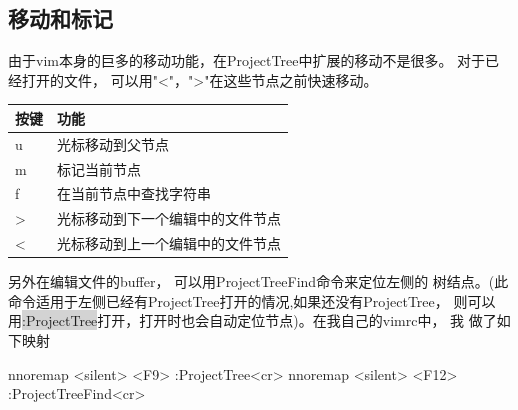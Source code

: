 \documentclass[oneside,openany]{book}
\begin{document}
  \subsection{移动和标记}
  由于vim本身的巨多的移动功能，在ProjectTree中扩展的移动不是很多。 对于已经打开的文件，
可以用"<"，">"在这些节点之前快速移动。
  \begin{table}[H]
  \centering
      \begin{tabular}{p{40pt}p{220pt}}
        \toprule
        按键& 功能\\
        \midrule
          u     &光标移动到父节点\\
          m     &标记当前节点\\
          f     &在当前节点中查找字符串\\
          >     &光标移动到下一个编辑中的文件节点\\
          <     &光标移动到上一个编辑中的文件节点\\
      \bottomrule
      \end{tabular}
  \end{table}
  另外在编辑文件的buffer， 可以用ProjectTreeFind命令来定位左侧的
树结点。(此命令适用于左侧已经有ProjectTree打开的情况,如果还没有ProjectTree，
则可以用\colorbox{lightgray}{:ProjectTree}打开，打开时也会自动定位节点)。在我自己的vimrc中， 我
做了如下映射
  \begin{mdframed}[style=SmallFrame]
    \begin{flushleft}
      nnoremap <silent> <F9>  :ProjectTree<cr>\newline
      nnoremap <silent> <F12> :ProjectTreeFind<cr>
    \end{flushleft}
  \end{mdframed}
\end{document}
